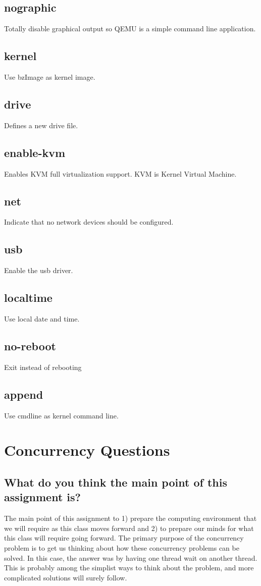 \documentclass[10pt,letterpaper,onecolumn,draftclsnofoot]{IEEEtran}
\begin{document}
\subsection{nographic}
Totally disable graphical output so QEMU is a simple command line application.

\subsection{kernel}
Use bzImage as kernel image.

\subsection{drive}
Defines a new drive file.

\subsection{enable-kvm}
Enables KVM full virtualization support. KVM is Kernel Virtual Machine.

\subsection{net}
Indicate that no network devices should be configured.

\subsection{usb}
Enable the usb driver.

\subsection{localtime}
Use local date and time.

\subsection{no-reboot}
Exit instead of rebooting

\subsection{append}
Use cmdline as kernel command line.

\section{Concurrency Questions}
\subsection{What do you think the main point of this assignment is?}
The main point of this assignment to 1) prepare the computing environment that we 
will require as this class moves forward and 2) to prepare our minds for what this 
class will require going forward. The primary purpose of the concurrency problem 
is to get us thinking about how these concurrency problems can be solved. In this 
case, the answer was by having one thread wait on another thread. This is probably 
among the simplist ways to think about the problem, and more complicated solutions 
will surely follow.
\end{document}
